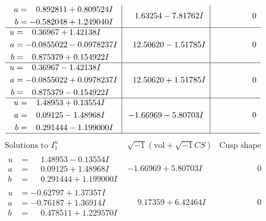 \documentclass[1p]{elsarticle_modified}
\theoremstyle{definition}
\newcommand{\I}{\sqrt{-1}}
\begin{document}
$$\begin{array}{c|c|c}
\begin{aligned}
a &= \phantom{-}0.892811 + 0.809524 I \\
b &= -0.582048 + 1.249040 I\end{aligned}
 & \phantom{-}1.63254 - 7.81762 I & \phantom{-0.000000 } 0 \\ \hline\begin{aligned}
u &= \phantom{-}0.36967 + 1.42138 I \\
a &= -0.0855022 - 0.0978237 I \\
b &= \phantom{-}0.875379 + 0.154922 I\end{aligned}
 & \phantom{-}12.50620 - 1.51785 I & \phantom{-0.000000 } 0 \\ \hline\begin{aligned}
u &= \phantom{-}0.36967 - 1.42138 I \\
a &= -0.0855022 + 0.0978237 I \\
b &= \phantom{-}0.875379 - 0.154922 I\end{aligned}
 & \phantom{-}12.50620 + 1.51785 I & \phantom{-0.000000 } 0 \\ \hline\begin{aligned}
u &= \phantom{-}1.48953 + 0.13554 I \\
a &= \phantom{-}0.09125 - 1.48968 I \\
b &= \phantom{-}0.291444 - 1.199000 I\end{aligned}
 & -1.66969 - 5.80703 I & \phantom{-0.000000 } 0\\
 \hline 
 \end{array}$$\newpage$$\begin{array}{c|c|c}  
\text{Solutions to }I^u_{1}& \I (\text{vol} + \sqrt{-1}CS) & \text{Cusp shape}\\
 \hline 
\begin{aligned}
u &= \phantom{-}1.48953 - 0.13554 I \\
a &= \phantom{-}0.09125 + 1.48968 I \\
b &= \phantom{-}0.291444 + 1.199000 I\end{aligned}
 & -1.66969 + 5.80703 I & \phantom{-0.000000 } 0 \\ \hline\begin{aligned}
u &= -0.62797 + 1.37357 I \\
a &= -0.76187 + 1.36914 I \\
b &= \phantom{-}0.478511 + 1.229570 I\end{aligned}
 & \phantom{-}9.17359 + 6.42464 I & \phantom{-0.000000 } 0 \\ \hline\begin{aligned}

\end{aligned}
\end{array}$$
\end{document}
